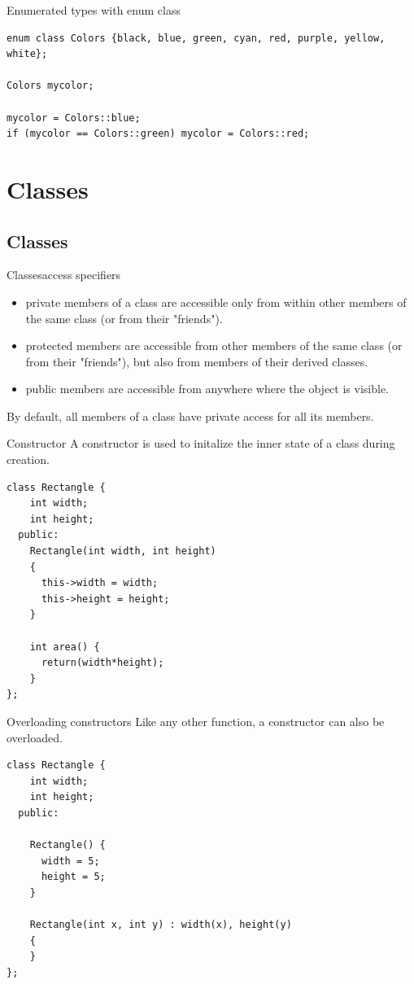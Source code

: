 \documentclass{beamer}
\begin{document}
\begin{frame}[fragile]{Enumerated types with enum class}
\begin{lstlisting}
enum class Colors {black, blue, green, cyan, red, purple, yellow, white};

Colors mycolor;

mycolor = Colors::blue;
if (mycolor == Colors::green) mycolor = Colors::red; 
\end{lstlisting}
\end{frame}


\section{Classes}
\subsection{Classes}
\begin{frame}{Classes}{access specifiers}
\begin{itemize}
  \item private members of a class are accessible only from within other members
        of the same class (or from their "friends").
  \item protected members are accessible from other members of the same class
        (or from their "friends"), but also from members of their derived
        classes.
  \item public members are accessible from anywhere where the object is
        visible.
\end{itemize}

By default, all members of a class have private access for all its members.
\end{frame}

\begin{frame}[fragile]{Constructor}
A constructor is used to initalize the inner state of a class during creation.
\begin{lstlisting}
class Rectangle {
    int width;
    int height;
  public:
    Rectangle(int width, int height)
    {
      this->width = width;
      this->height = height;
    }

    int area() {
      return(width*height);
    }
};
\end{lstlisting}
\end{frame}

\begin{frame}[fragile]{Overloading constructors}
Like any other function, a constructor can also be overloaded.
\begin{lstlisting}
class Rectangle {
    int width;
    int height;
  public:

    Rectangle() {
      width = 5;
      height = 5;
    }

    Rectangle(int x, int y) : width(x), height(y)
    {
    }
};
\end{lstlisting}
\end{frame}
\end{document}
